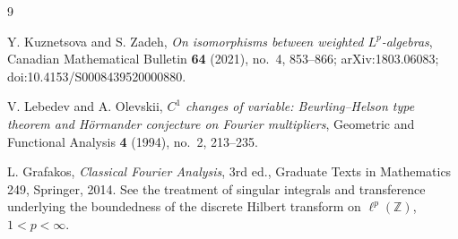 \documentclass[11pt]{article}
\newcommand{\Z}{\mathbb Z}
\begin{document}
\begin{thebibliography}{9}

Y. Kuznetsova and S. Zadeh,
\emph{On isomorphisms between weighted $L^p$-algebras},
Canadian Mathematical Bulletin \textbf{64} (2021), no.~4, 853--866;
arXiv:1803.06083; doi:10.4153/S0008439520000880.

V. Lebedev and A. Olevskii,
\emph{$C^1$ changes of variable: Beurling--Helson type theorem and
H\"ormander conjecture on Fourier multipliers},
Geometric and Functional Analysis \textbf{4} (1994), no.~2, 213--235.

L. Grafakos,
\emph{Classical Fourier Analysis}, 3rd ed., Graduate Texts in Mathematics
249, Springer, 2014.  See the treatment of singular integrals and
transference underlying the boundedness of the discrete Hilbert transform on
$\ell^p(\Z)$, $1<p<\infty$.

\end{thebibliography}
\end{document}
